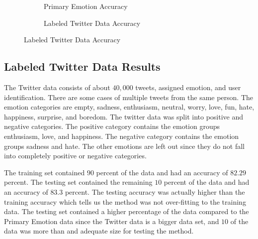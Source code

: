 \documentclass[titlepage,letterpaper]{article}
\begin{document}

		
\begin{figure}[]
	\hfill
	\vspace*{-1in}
	\centering
	\begin{adjustwidth}{-.75in}{-.75in}
		
 \begin{subfigure}{3in}
 	\centering
	\resizebox{3in}{!}{}
	\caption{Primary Emotion Accuracy}\label{primemresult}
\end{subfigure}
\hfill
\begin{subfigure}{3in}
	\centering
	\resizebox{3in}{!}{}
	\caption{Labeled Twitter Data Accuracy} \label{lbtwitresult}
\end{subfigure}
\hfill
\end{adjustwidth}
\end{figure}
\subsection{Labeled Twitter Data Results}

The Twitter data consists of about $40,000$ tweets, assigned emotion, and user identification. There are some cases of multiple tweets from the same person. The emotion categories are empty, sadness, enthusiasm, neutral, worry, love, fun, hate, happiness, surprise, and boredom. The twitter data was split into positive and negative categories. The positive category contains the emotion groups enthusiasm, love, and happiness. The negative category contains the emotion groups sadness and hate. The other emotions are left out since they do not fall into completely positive or negative categories. 

The training set contained $90$ percent of the data and had an accuracy of $82.29$ percent. The testing set contained the remaining $10$ percent of the data and had an accuracy of $83.3$ percent. The testing accuracy was actually higher than the training accuracy which tells us the method was not over-fitting to the training data. The testing set contained a higher percentage of the data compared to the Primary Emotion data since the Twitter data is a bigger data set, and $10$ of the data was more than and adequate size for testing the method. 
\end{document}
